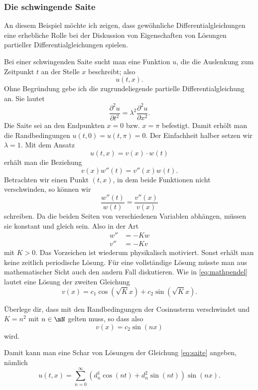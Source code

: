 \documentclass[%
draft,
11pt,%
twoside,%
titlepage,%
german,%
headsepline%
]{scrartcl}
\begin{document}
\subsubsection{Die schwingende Saite}

\begin{bem}
An diesem Beispiel m\"ochte ich zeigen, dass gew\"ohnliche Differentialgleichungen eine erhebliche Rolle bei der Diskussion von Eigenschaften von L\"osungen partieller Differentialgleichungen spielen.
\end{bem}

Bei einer schwingenden Saite sucht man eine Funktion $u$, die die Auslenkung zum Zeitpunkt $t$ an der Stelle $x$ beschreibt; also
$$u(t,x).$$
Ohne Begr\"undung gebe ich die zugrundeliegende partielle Differentialgleichung an. Sie lautet
\begin{equation}\label{eq:saite}
\frac{\partial^2u}{\partial t^2}=\lambda^2\frac{\partial^2u}{\partial x^2}.
\end{equation}
Die Saite sei an den Endpunkten $x=0$ bzw. $x=\pi$ befestigt. Damit erh\"olt man die Randbedingungen $u(t,0)=u(t,\pi)=0$. Der Einfachheit halber setzen wir $\lambda=1$.
Mit dem Ansatz
$$u(t,x)=v(x)\cdot w(t)$$
erh\"alt man die Beziehung
$$v(x)w''(t)=v''(x)w(t).$$
Betrachten wir einen Punkt $(t,x)$, in dem beide Funktionen nicht verschwinden, so k\"onnen wir
$$\frac{w''(t)}{w(t)}=\frac{v''(x)}{v(x)}$$
schreiben. Da die beiden Seiten von verschiedenen Variablen abh\"angen, m\"ussen sie konstant und gleich sein. Also in der Art
\begin{align*}
w''&=-Kw\\
v''&=-Kv
\end{align*}
mit $K>0$. Das Vorzeichen ist wiederum physikalisch motiviert. Sonst erh\"alt man keine zeitlich periodische L\"osung. F\"ur eine vollst\"andige L\"osung m\"usste man aus mathematischer Sicht auch den andern Fall diskutieren. Wie in \eqref{eq:mathpendel} lautet eine L\"osung der zweiten Gleichung
$$v(x)=c_1\cos(\sqrt{K}x)+c_2\sin(\sqrt{K}x).$$

\begin{ueb}
\"Uberlege dir, dass mit den Randbedingungen der Cosinusterm verschwindet und $K=n^2$ mit $n\in\mN$ gelten muss, so dass also
$$v(x)=c_2\sin(nx)$$
wird.
\end{ueb}

\noindent Damit kann man eine Schar von L\"osungen der Gleichung \eqref{eq:saite} angeben, n\"amlich
$$u(t,x)=\sum_{n=0}^\infty\left(d_n^1\cos(nt)+d_n^2\sin(nt)\right)\sin(nx).$$
\end{document}
